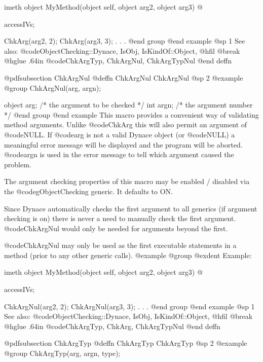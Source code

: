 imeth object  MyMethod(object self, object arg2, object arg3)
@{
        accessIVs;

        ChkArg(arg2, 2);
        ChkArg(arg3, 3);
        .
        .
        .
@end group
@end example
@sp 1
See also:  @code{ObjectChecking::Dynace, IsObj, IsKindOf::Object,}
@hfil @break @hglue .64in @code{ChkArgTyp, ChkArgNul, ChkArgTypNul}
@end deffn










@pdfsubsection {ChkArgNul}
@deffn {ChkArgNul} ChkArgNul
@sp 2
@example
@group
ChkArgNul(arg, argn);

object  arg;    /*  the argument to be checked  */
int     argn;   /*  the argument number         */
@end group
@end example
This macro provides a convenient way of validating method arguments.
Unlike @code{ChkArg} this will also permit an argument of @code{NULL}.
If @code{arg} is not a valid Dynace object (or @code{NULL}) a meaningful
error message will be displayed and the program will be aborted.
@code{argn} is used in the error message to tell which argument caused
the problem.

The argument checking properties of this macro may be enabled / disabled
via the @code{gObjectChecking} generic.  It defaults to ON.

Since Dynace automatically checks the first argument to all generics (if
argument checking is on) there is never a need to manually check the
first argument.  @code{ChkArgNul} would only be needed for arguments
beyond the first.

@code{ChkArgNul} may only be used as the first executable statements in a
method (prior to any other generic calls).
@example
@group
@exdent Example:

imeth object  MyMethod(object self, object arg2, object arg3)
@{
        accessIVs;

        ChkArgNul(arg2, 2);
        ChkArgNul(arg3, 3);
        .
        .
        .
@end group
@end example
@sp 1
See also:  @code{ObjectChecking::Dynace, IsObj, IsKindOf::Object,}
@hfil @break @hglue .64in @code{ChkArgTyp, ChkArg, ChkArgTypNul}
@end deffn










@pdfsubsection {ChkArgTyp}
@deffn {ChkArgTyp} ChkArgTyp
@sp 2
@example
@group
ChkArgTyp(arg, argn, type);

}}
